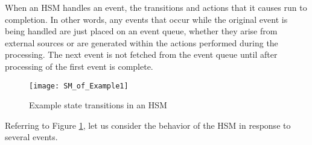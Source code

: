 \documentclass[12pt]{article}
\begin{document}
When an HSM handles an event, the transitions and actions that it causes run to completion. In other words, any events that occur while the original event is being handled are just placed on an event queue,  whether they arise from external sources or are generated within the actions performed during the processing. The next event is not fetched from the event queue until after processing of the first event is complete.

\begin{figure}[h]
	\centering
	\texttt{[image: SM\_of\_Example1]}
	\caption[Example of state transitions in an HSM]{Example state transitions in an HSM}
	\label{fig:smofexample1}
\end{figure}

Referring to Figure \ref{fig:smofexample1}, let us consider the behavior of the HSM in response to several events.
\end{document}
